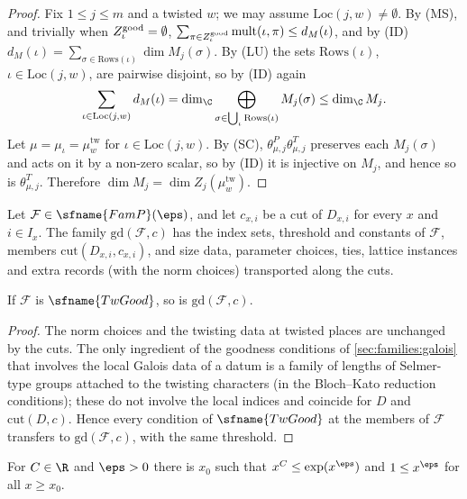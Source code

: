 \begin{proof}
Fix $1\le j\le m$ and a twisted $w$; we may assume $\mathrm{Loc}(j,w)\ne\emptyset$. By (MS), and trivially when
$Z^{\mathrm{good}}_\iota=\emptyset$, $\sum_{\pi\in Z^{\mathrm{good}}_\iota}\mathrm{mult}(\iota,\pi)\le d_M(\iota)$, and by (ID)
$d_M(\iota)=\sum_{\sigma\in\mathrm{Rows}(\iota)}\dim M_j(\sigma)$. By (LU) the sets $\mathrm{Rows}(\iota)$, $\iota\in\mathrm{Loc}(j,w)$,
are pairwise disjoint, so by (ID) again
\[
\sum_{\iota\in\mathrm{Loc}(j,w)}d_M(\iota)=\dim_\C\bigoplus_{\sigma\in\bigcup_\iota\mathrm{Rows}(\iota)}M_j(\sigma)\le\dim_\C M_j.
\]
Let $\mu=\mu_\iota=\mu^{\mathrm{tw}}_w$ for $\iota\in\mathrm{Loc}(j,w)$. By (SC), $\theta^P_{\mu,j}\theta^T_{\mu,j}$ preserves each
$M_j(\sigma)$ and acts on it by a non-zero scalar, so by (ID) it is injective on $M_j$, and hence so is $\theta^T_{\mu,j}$.
Therefore $\dim M_j=\dim Z_j(\mu^{\mathrm{tw}}_w)$.
\end{proof}

\begin{definition}\label{pf:linkN:gd}
Let $\mathcal F\in\sfname{FamP}(\eps)$, and let $c_{x,i}$ be a cut of $D_{x,i}$ for every $x$ and $i\in I_x$. The family
$\mathrm{gd}(\mathcal F,c)$ has the index sets, threshold and constants of $\mathcal F$, members
$\mathrm{cut}(D_{x,i},c_{x,i})$, and size data, parameter choices, ties, lattice instances and extra records (with the norm
choices) transported along the cuts.
\end{definition}

\begin{lemma}\label{pf:linkN:twgd}
If $\mathcal F$ is $\sfname{TwGood}$, so is $\mathrm{gd}(\mathcal F,c)$.
\end{lemma}

\begin{proof}
The norm choices and the twisting data at twisted places are unchanged by the cuts. The only ingredient of the goodness
conditions of \cref{sec:families:galois} that involves the local Galois data of a datum is a family of lengths of
Selmer-type groups attached to the twisting characters (in the Bloch--Kato reduction conditions); these do not involve
the local indices and coincide for $D$ and $\mathrm{cut}(D,c)$. Hence every condition of $\sfname{TwGood}$ at the members of
$\mathcal F$ transfers to $\mathrm{gd}(\mathcal F,c)$, with the same threshold.
\end{proof}

\begin{lemma}\label{pf:linkN:evpow}
For $C\in\R$ and $\eps>0$ there is $x_0$ such that $x^C\le\exp(x^\eps)$ and $1\le x^\eps$ for all $x\ge x_0$.
\end{lemma}

